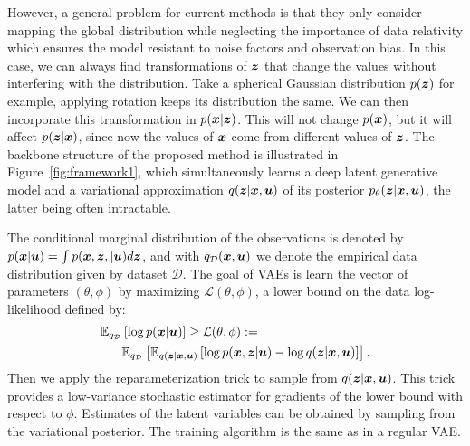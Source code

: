 \documentclass[sigconf]{acmart} %
\begin{document}
However, a general problem for current methods is that they only consider mapping the global distribution while neglecting the importance of data relativity which ensures the model resistant to noise factors and observation bias. 
In this case, we can always find transformations of ${\bm{z}}$ that change the values without interfering with the distribution. Take a spherical Gaussian distribution $p({\bm{z}})$ for example, applying rotation keeps its distribution the same. We can then incorporate this transformation in $p({\bm{x}}\vert{\bm{z}})$. This will not change $p({\bm{x}})$, but it will affect $p({\bm{z}}\vert{\bm{x}})$, since now the values of ${\bm{x}}$ come from different values of ${\bm{z}}$. 
The backbone structure of the proposed method is illustrated in Figure~\ref{fig:framework1}, which simultaneously learns a deep latent generative model and a variational approximation $q({\bm{z}}\vert{\bm{x}},{\bm{u}})$ of its posterior $p_{\theta}({\bm{z}}\vert{\bm{x}},{\bm{u}})$, the latter being often intractable. 

The conditional marginal distribution of the observations is denoted by $p({\bm{x}}\vert{\bm{u}}) = \int p({\bm{x}}, {\bm{z}}, \vert{\bm{u}})d{\bm{z}}$, and with $q_{\mathcal{D}}({\bm{x}}, {\bm{u}})$ we denote the empirical data distribution given by dataset $\mathcal{D}$. The goal of VAEs is learn the vector of parameters $(\theta, \phi)$ by maximizing $\mathcal{L}(\theta, \phi)$, a lower bound on the data log-likelihood defined by:
\begin{equation}
\label{eq:loss}
    \begin{aligned}
        \mathbb{E}_{q_{\mathcal{D}}}&\left[ \log p({\bm{x}}\vert {\bm{u}})\right] \geq \mathcal{L} (\theta, \phi) := \\
        &\mathbb{E}_{q_{\mathcal{D}}} \left[ \mathbb{E}_{q({\bm{z}} \vert {\bm{x}},{\bm{u}})} \left[\log p({\bm{x}},{\bm{z}}\vert{\bm{u}}) - \log q({\bm{z}}\vert{\bm{x}},{\bm{u}})\right]\right].
    \end{aligned}
\end{equation}
Then we apply the reparameterization trick \citep{kingma2015variational} to sample from $q({\bm{z}}\vert{\bm{x}},{\bm{u}})$. This trick provides a low-variance stochastic estimator for gradients of the lower bound with respect to $\phi$. Estimates of the latent variables can be obtained by sampling from the variational posterior. The training algorithm is the same as in a regular VAE. 
\end{document}

